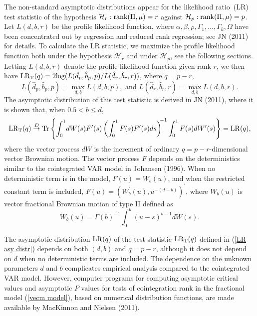 \documentclass[12pt]{article}
\def\lr{{\rm LR}}
\def\lrt{{\rm LR_{T}}}
\begin{document}
The non-standard asymptotic distributions appear for the
likelihood ratio\ (LR) test statistic of the hypothesis $\mathcal{H}_{r}:{\rm rank}(\Pi ,\mu )=r$ against $\mathcal{H}_{p}:{\rm rank}(\Pi ,\mu )=p$. Let $L(d,b,r)$ be the profile likelihood
function, where $\alpha,\beta,\rho,\Gamma_{1},\ldots,\Gamma_{k},\Omega$ have
been concentrated out by regression and reduced rank regression; see JN
(2011) for details. To calculate the LR statistic, we maximize the profile
likelihood function both under the hypothesis $\mathcal{H}_{r}$ and
under $\mathcal{H}_{p}$, see the following sections. Letting $L(d,b,r)$ denote the profile likelihood function given rank $r$, we then have $\lrt(q) = 2 {\rm log} 
(L(\hat{d}_{p},\hat{b}_{p},p)/L(\hat{d}_{r},\hat{b}_{r},r))$, where
$q=p-r$,
\[
L(\hat{d}_{p},\hat{b}_{p},p) = \max_{d,b}L(d,b,p),
\text{ and }
L(\hat{d}_{r},\hat{b}_{r},r) = \max_{d,b}L(d,b,r).
\]
The asymptotic distribution of this test statistic is derived in JN (2011),
where it is shown that, when $0.5<b \leq d$,
\begin{equation}
\lrt(q)\overset{D}{\rightarrow}{\rm Tr}
\left\{ \int_{0}^{1}\!dW(s)F^{\prime}(s)
\left( \int_{0}^{1}F(s)F^{\prime}(s) ds\right)^{\!\!-1}
\int_{0}^{1}F(s)dW^{\prime}(s)\right\}=\lr(q), \label{LR asy distr}%
\end{equation}
where the vector process $dW$ is the increment of ordinary $q=p-r$-dimensional 
vector Brownian motion. The vector process $F$ depends on the 
deterministics similar to the cointegrated VAR model in Johansen (1996). When no 
deterministic term is in the model, $F (u) = W_{b}(u)$, and when the restricted 
constant term is included, $F (u) = (W_{b}^{\prime}(u),u^{-(d-b)})^{\prime}$, 
where $W_{b}(u)$ is vector fractional Brownian motion of type II defined as
\begin{equation}
W_{b} (u) = \Gamma(b)^{-1} \int_{0}^{u}(u-s)^{b-1}dW (s).
\label{define fBM}
\end{equation}

The asymptotic distribution $\lr(q)$  of the test statistic $\lrt(q)$ defined in (\ref{LR asy distr}) 
depends on both $(d,b)$ and $q=p-r$, although it does not depend on $d$ when no 
deterministic terms are included. The dependence on the
unknown parameters $d$ and $b$ complicates empirical analysis compared to the
cointegrated VAR model. However, computer programs for computing asymptotic critical values and asymptotic
$P$ values for tests of cointegration rank in the fractional model
(\ref{vecm model}), based on numerical distribution functions, are made available
by MacKinnon and Nielsen (2011).
\end{document}
